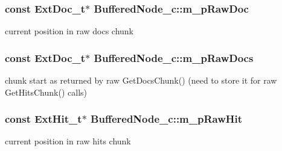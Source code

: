 \hypertarget{classBufferedNode__c_a2baee654bcd29bcaa8da922a239a81b6}{
\subsubsection[{m\-\_\-p\-Raw\-Doc}]{\setlength{\rightskip}{0pt plus 5cm}const {\bf Ext\-Doc\-\_\-t}$\ast$ Buffered\-Node\-\_\-c\-::m\-\_\-p\-Raw\-Doc\hspace{0.3cm}{\ttfamily [protected]}}}\label{classBufferedNode__c_a2baee654bcd29bcaa8da922a239a81b6}


current position in raw docs chunk 

\hypertarget{classBufferedNode__c_a2a393307926ac4c2449e7946e5bf74b1}{
\subsubsection[{m\-\_\-p\-Raw\-Docs}]{\setlength{\rightskip}{0pt plus 5cm}const {\bf Ext\-Doc\-\_\-t}$\ast$ Buffered\-Node\-\_\-c\-::m\-\_\-p\-Raw\-Docs\hspace{0.3cm}{\ttfamily [protected]}}}\label{classBufferedNode__c_a2a393307926ac4c2449e7946e5bf74b1}


chunk start as returned by raw Get\-Docs\-Chunk() (need to store it for raw Get\-Hits\-Chunk() calls) 

\hypertarget{classBufferedNode__c_a53f77e1199cfb9312c5f9e6263dd7b59}{
\subsubsection[{m\-\_\-p\-Raw\-Hit}]{\setlength{\rightskip}{0pt plus 5cm}const {\bf Ext\-Hit\-\_\-t}$\ast$ Buffered\-Node\-\_\-c\-::m\-\_\-p\-Raw\-Hit\hspace{0.3cm}{\ttfamily [protected]}}}\label{classBufferedNode__c_a53f77e1199cfb9312c5f9e6263dd7b59}


current position in raw hits chunk 

